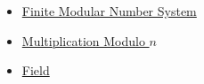 \begin{dependencies}
\begin{itemize}
  \item \hyperref[def:finite-modular-number-system]{Finite Modular Number System}
  \item \hyperref[def:multiplication-modulo-n]{Multiplication Modulo \(n\)}
  \item \hyperref[def:abstract-field]{Field}
\end{itemize}
\end{dependencies}
